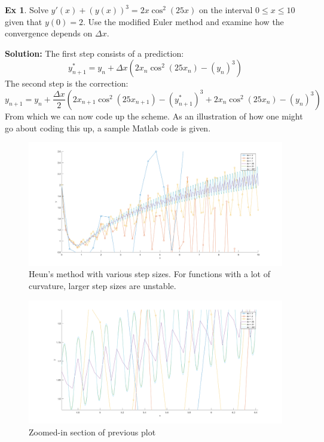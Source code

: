 \documentclass[]{article}
\theoremstyle{definition}
\newtheorem{exmp}{Ex}[section]
\numberwithin{equation}{section}
\begin{document}
	\begin{exmp}
	Solve $y'(x) + (y(x))^3 = 2x\cos^2(25x)$ on the interval $ 0 \leq x \leq 10 $ given that $y(0) = 2$. Use the modified Euler method and examine how the convergence depends on $\Delta x$.
	\end{exmp}
	\textbf{Solution:} The first step consists of a prediction:
	\begin{equation*}
		y^*_{n+1} = y_n + \Delta x \left(2x_n \cos^2(25x_n) - (y_n)^3\right)
	\end{equation*}
	The second step is the correction:
		\begin{equation*}
			y_{n+1} = y_n + \frac{\Delta x}{2} \left(2x_{n+1}\cos^2(25x_{n+1}) - (y^*_{n+1})^3 + 2x_n \cos^2(25x_n) - (y_n)^3\right)
		\end{equation*}
	From which we can now code up the scheme. As an illustration of how one might go about coding this up, a sample Matlab code is given.
		
		\begin{center}
		\begin{figure}[H]
			\includegraphics[scale=.35]{ex4_1_fig.png} 
			\caption{Heun's method with various step sizes. For functions with a lot of curvature, larger step sizes are unstable.}
			\label{fig:Heun1_1}
		\end{figure}
		\begin{figure}[H]
		\includegraphics[scale=.3]{ex4_2_fig.png} 
		\caption{Zoomed-in section of previous plot}
		\label{fig:Heun1_2}
	\end{figure}
	
	\end{center}
\end{document}
